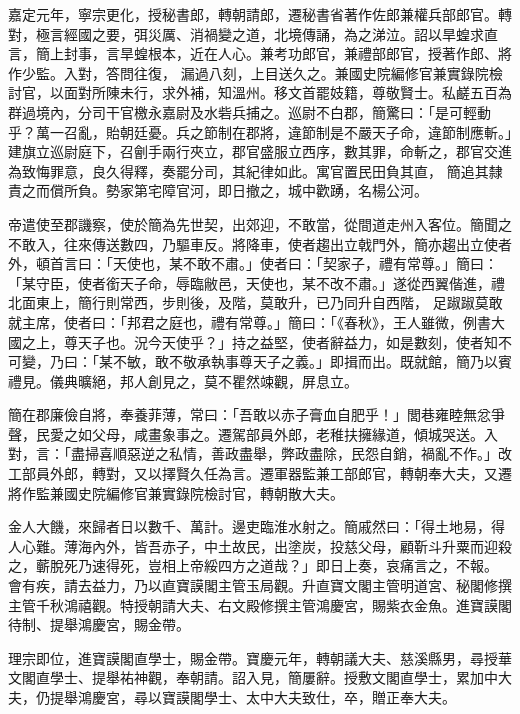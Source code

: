 \begin{pinyinscope}
 嘉定元年，寧宗更化，授秘書郎，轉朝請郎，遷秘書省著作佐郎兼權兵部郎官。轉對，極言經國之要，弭災厲、消禍變之道，北境傳誦，為之涕泣。詔以旱蝗求直言，簡上封事，言旱蝗根本，近在人心。兼考功郎官，兼禮部郎官，授著作郎、將作少監。入對，答問往復，
 漏過八刻，上目送久之。兼國史院編修官兼實錄院檢討官，以面對所陳未行，求外補，知溫州。移文首罷妓籍，尊敬賢士。私鹺五百為群過境內，分司干官檄永嘉尉及水砦兵捕之。巡尉不白郡，簡驚曰：「是可輕動乎？萬一召亂，貽朝廷憂。兵之節制在郡將，違節制是不嚴天子命，違節制應斬。」建旗立巡尉庭下，召劊手兩行夾立，郡官盛服立西序，數其罪，命斬之，郡官交進為致悔罪意，良久得釋，奏罷分司，其紀律如此。寓官置民田負其直，
 簡追其隸責之而償所負。勢家第宅障官河，即日撤之，城中歡踴，名楊公河。



 帝遣使至郡譏察，使於簡為先世契，出郊迎，不敢當，從間道走州入客位。簡聞之不敢入，往來傳送數四，乃驅車反。將降車，使者趨出立戟門外，簡亦趨出立使者外，頓首言曰：「天使也，某不敢不肅。」使者曰：「契家子，禮有常尊。」簡曰：「某守臣，使者銜天子命，辱臨敝邑，天使也，某不改不肅。」遂從西翼偕進，禮北面東上，簡行則常西，步則後，及階，莫敢升，已乃同升自西階，
 足踧踧莫敢就主席，使者曰：「邦君之庭也，禮有常尊。」簡曰：「《春秋》，王人雖微，例書大國之上，尊天子也。況今天使乎？」持之益堅，使者辭益力，如是數刻，使者知不可變，乃曰：「某不敏，敢不敬承執事尊天子之義。」即揖而出。既就館，簡乃以賓禮見。儀典曠絕，邦人創見之，莫不瞿然竦觀，屏息立。



 簡在郡廉儉自將，奉養菲薄，常曰：「吾敢以赤子膏血自肥乎！」閭巷雍睦無忿爭聲，民愛之如父母，咸畫象事之。遷駕部員外郎，老稚扶擁緣道，傾城哭送。入
 對，言：「盡掃喜順惡逆之私情，善政盡舉，弊政盡除，民怨自銷，禍亂不作。」改工部員外郎，轉對，又以擇賢久任為言。遷軍器監兼工部郎官，轉朝奉大夫，又遷將作監兼國史院編修官兼實錄院檢討官，轉朝散大夫。



 金人大饑，來歸者日以數千、萬計。邊吏臨淮水射之。簡戚然曰：「得土地易，得人心難。薄海內外，皆吾赤子，中土故民，出塗炭，投慈父母，顧靳斗升粟而迎殺之，蘄脫死乃速得死，豈相上帝綏四方之道哉？」即日上奏，哀痛言之，不報。
 會有疾，請去益力，乃以直寶謨閣主管玉局觀。升直寶文閣主管明道宮、秘閣修撰主管千秋鴻禧觀。特授朝請大夫、右文殿修撰主管鴻慶宮，賜紫衣金魚。進寶謨閣待制、提舉鴻慶宮，賜金帶。



 理宗即位，進寶謨閣直學士，賜金帶。寶慶元年，轉朝議大夫、慈溪縣男，尋授華文閣直學士、提舉祐神觀，奉朝請。詔入見，簡屢辭。授敷文閣直學士，累加中大夫，仍提舉鴻慶宮，尋以寶謨閣學士、太中大夫致仕，卒，贈正奉大夫。




\end{pinyinscope}
